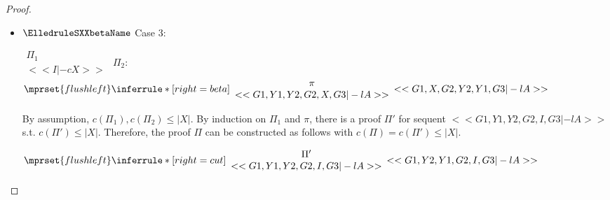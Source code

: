\begin{proof}
\begin{enumerate}
\begin{itemize}
    \item $\ElledruleSXXbetaName$ Case 3:
      \begin{center}
        \scriptsize
        \begin{math}
          \begin{array}{c}
            \Pi_1 \\
            {<<I |-c X>>}
          \end{array}
        \end{math}
        \qquad\qquad
        $\Pi_2$:
        \begin{math}
          $$\mprset{flushleft}
          \inferrule* [right={\tiny beta}] {
            {
              \begin{array}{c}
                \pi \\
                {<<G1, Y1, Y2, G2, X, G3 |-l A>>}
              \end{array}
            }
          }{<<G1, X, G2, Y2, Y1, G3 |-l A>>}
        \end{math}
      \end{center}
      By assumption, $c(\Pi_1),c(\Pi_2)\leq |X|$. By induction on $\Pi_1$ and $\pi$, there is
      a proof $\Pi'$ for sequent $<<G1, Y1, Y2, G2, I, G3 |-l A>>$ s.t. $c(\Pi') \leq |X|$.
      Therefore, the proof $\Pi$ can be constructed as follows with
      $c(\Pi) = c(\Pi') \leq |X|$.
      \begin{center}
        \scriptsize
        \begin{math}
          $$\mprset{flushleft}
          \inferrule* [right={\tiny cut}] {
            {
              \begin{array}{cc}
                \Pi' \\
                {<<G1, Y1, Y2, G2, I, G3 |-l A>>}
              \end{array}
            }
          }{<<G1, Y2, Y1, G2, I, G3 |-l A>>}
        \end{math}
      \end{center}


\end{itemize}
\end{enumerate}
\end{proof}
